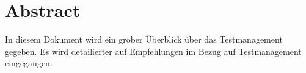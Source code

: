 \chapter{Abstract}
In diesem Dokument wird ein grober \"Uberblick \"uber das Testmanagement gegeben. Es wird detailierter auf Empfehlungen im Bezug auf Testmanagement eingegangen.